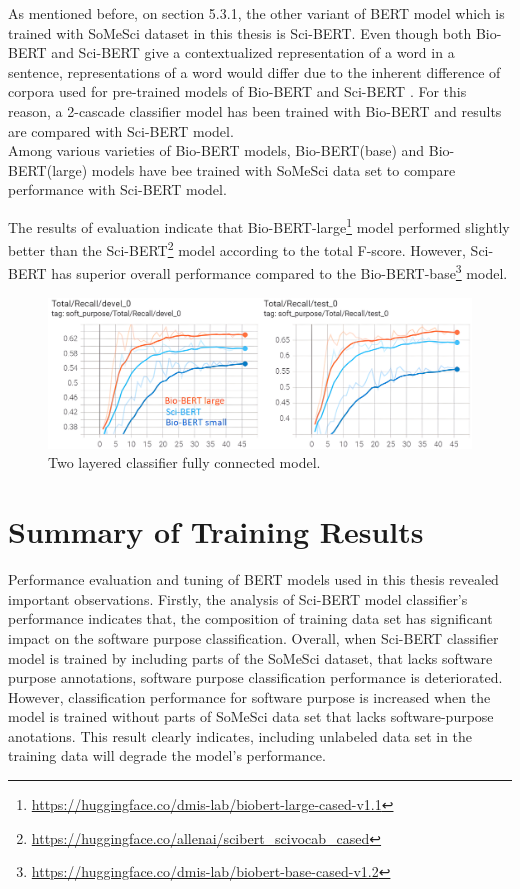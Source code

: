 As mentioned before, on section 5.3.1, the other variant of BERT model which is trained with SoMeSci dataset in this thesis is Sci-BERT. Even though both \ac{Bio-BERT} and \ac{Sci-BERT} give a contextualized representation of a word in a sentence, representations of a word would differ due to the inherent difference of corpora used for pre-trained models of Bio-BERT and Sci-BERT \citep{beltagy2019scibert,li2019fine}. For this reason, a 2-cascade classifier model has been trained with Bio-BERT and results are compared with Sci-BERT model. \\

Among various varieties of Bio-BERT models, Bio-BERT(base) and Bio-BERT(large) models have bee trained with SoMeSci data set to compare performance with Sci-BERT model.

The results of evaluation indicate that  Bio-BERT-large\footnote{\url{https://huggingface.co/dmis-lab/biobert-large-cased-v1.1}} model performed slightly better than the Sci-BERT\footnote{\url{https://huggingface.co/allenai/scibert_scivocab_cased}} model according to the total F-score. However, Sci-BERT has superior overall performance compared to the Bio-BERT-base\footnote{\url{https://huggingface.co/dmis-lab/biobert-base-cased-v1.2}} model. 

\begin{figure}[htbp]
	\centering
	\includegraphics[width=.90\textwidth]{4.graphics/figures/ch_6/6.BIoBERT_vs_SCIBERT_2LAYER_Classifier/HD/1}
	\caption{Two layered classifier fully connected model.}
	\label{fig:chapter06:with}
\end{figure}

\section{Summary of Training Results }
\label{sec:chapter06:summary}

Performance evaluation and tuning of BERT models used in this thesis revealed important observations. Firstly, the analysis of Sci-BERT model classifier's performance indicates that, the composition of training data set has significant impact on the software purpose classification. Overall, when Sci-BERT classifier model is trained by including parts of the SoMeSci dataset, that lacks software purpose annotations, software purpose classification performance is deteriorated. However, classification performance for software purpose is increased when the model is trained without parts of SoMeSci data set that lacks software-purpose anotations. This result clearly indicates, including unlabeled data set in the training data will degrade the model's performance.  \\

